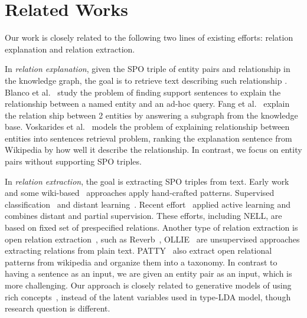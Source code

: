 \section{Related Works}
\label{sec:rel}

Our work is closely related to the following two lines of existing efforts: relation explanation and relation extraction.


In \emph{relation explanation}, given the SPO triple of entity pairs and relationship in the knowledge graph, the goal is to retrieve text describing such relationship .
Blanco et al.~\cite{blanco2010finding} study the problem of finding support sentences to explain the relationship between a named entity and an ad-hoc query.
Fang et al.~\cite{fang2011rex} explain the relation ship between 2 entities by answering a subgraph from the knowledge base.
Voskarides et al.~\cite{voskarideslearning} models the problem of explaining relationship between entities into sentences retrieval problem, ranking the explanation sentence from Wikipedia by how well it describe the relationship.
In contrast, we focus on entity pairs without supporting SPO triples.
 

In \emph{relation extraction}, the goal is extracting SPO triples from text.
Early work~\cite{hearst1992automatic,brin1999extracting,agichtein2000snowball} and some wiki-based~\cite{ponzetto2008wikitaxonomy} approaches apply hand-crafted patterns.
Supervised classification~\cite{doddington2004automatic,guodong2005exploring} and distant learning~\cite{craven1999constructing,wu2007autonomously,bunescu2007learning,mintz2009distant}.
Recent effort~\cite{angeli2014combining} applied active learning and combines distant and partial supervision.
These efforts, including NELL, are based on  fixed set of prespecified relations.
Another type of relation extraction is open relation extraction~\cite{banko2007open}, such as Reverb~\cite{fader2011identifying}, OLLIE~\cite{schmitz2012open} are unsupervised approaches extracting relations from plain text.
PATTY~\cite{nakashole2012patty} also extract open relational patterns from wikipedia and organize them into a taxonomy.
In contrast to having a sentence as an input, we are given an entity pair as an input, which is more challenging.
Our approach is closely related to generative models of using rich concepts~\cite{yao2011structured}, instead of the latent variables used in type-LDA model,
though research question is different.



